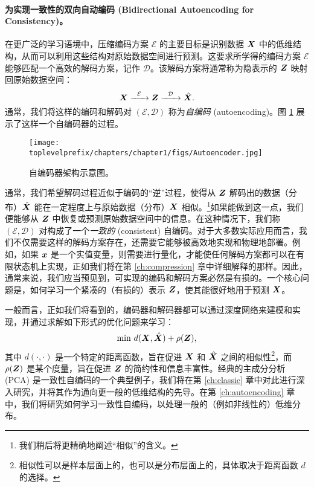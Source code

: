 \documentclass[../../book-main_zh.tex]{subfiles}
\begin{document}
\paragraph{为实现一致性的双向自动编码 (Bidirectional Autoencoding for Consistency)。}
在更广泛的学习语境中，压缩编码方案 $\mathcal{E}$ 的主要目标是识别数据 $\bm{X}$ 中的低维结构，从而可以利用这些结构对原始数据空间进行预测。这要求所学得的编码方案 $\mathcal{E}$ 能够匹配一个高效的解码方案，记作 $\mathcal{D}$。该解码方案将通常称为隐表示的 $\bm{Z}$ 映射回原始数据空间：
\begin{equation}
    \bm{X}   \xrightarrow{\hspace{2mm} \mathcal{E}\hspace{2mm}} \bm{Z}  \xrightarrow{\hspace{2mm} \mathcal{D} \hspace{2mm}} \hat {\bm{X}}.
       \label{eqn:auto-encoding}
\end{equation}
通常，我们将这样的编码和解码对 $(\mathcal{E}, \mathcal{D})$ 称为{\em 自编码} (autoencoding)。图 \ref{fig:autoencoder}
展示了这样一个自编码器的过程。
\begin{figure}
    \centering
    \texttt{[image: \\toplevelprefix/chapters/chapter1/figs/Autoencoder.jpg]}
    \caption{自编码器架构示意图。}
    \label{fig:autoencoder}
\end{figure}


通常，我们希望解码过程近似于编码的“逆”过程，使得从 $\bm{Z}$ 解码出的数据（分布）$\hat {\bm{X}}$ 能在一定程度上与原始数据（分布）$\bm{X}$ 相似。\footnote{我们稍后将更精确地阐述“相似”的含义。}如果能做到这一点，我们便能够从 $\bm{Z}$ 中恢复或预测原始数据空间中的信息。在这种情况下，我们称 $(\mathcal{E}, \mathcal{D})$ 对构成了一个{\em 一致的} (consistent) 自编码。对于大多数实际应用而言，我们不仅需要这样的解码方案存在，还需要它能够被高效地实现和物理地部署。例如，如果 $\bm{x}$ 是一个实值变量，则需要进行量化，才能使任何解码方案都可以在有限状态机上实现，正如我们将在第 \ref{ch:compression} 章中详细解释的那样。因此，通常来说，我们应当预见到，可实现的编码和解码方案必然是有损的。一个核心问题是，如何学习一个紧凑的（有损的）表示 $\bm{Z}$，使其能很好地用于预测 $\bm{X}$。

一般而言，正如我们将看到的，编码器和解码器都可以通过深度网络来建模和实现，并通过求解如下形式的优化问题来学习：
\begin{equation}
   \min \, d( \bm{X}, \hat {\bm{X}}) + \rho(\bm{Z}), 
   \label{eqn:auto-encoding-objective}
\end{equation}
其中 $d(\cdot, \cdot)$ 是一个特定的距离函数，旨在促进 $\bm{X}$ 和 $\hat {\bm{X}}$ 之间的相似性\footnote{相似性可以是样本层面上的，也可以是分布层面上的，具体取决于距离函数 $d$ 的选择。}，而 $\rho(\bm{Z})$ 是某个度量，旨在促进 $\bm{Z}$ 的简约性和信息丰富性。经典的主成分分析 (PCA) \cite{JolliffeI2002} 是一致性自编码的一个典型例子，我们将在第 \ref{ch:classic} 章中对此进行深入研究，并将其作为通向更一般的低维结构的先导。在第 \ref{ch:autoencoding} 章中，我们将研究如何学习一致性自编码，以处理一般的（例如非线性的）低维分布。
\end{document}
